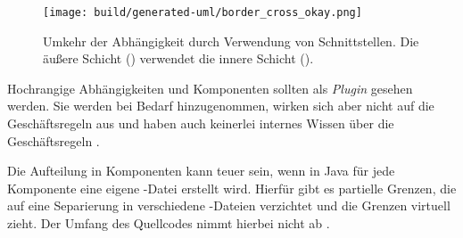 \begin{figure}
  \centering
  \texttt{[image: build/generated-uml/border\_cross\_okay.png]}
   \caption{Umkehr der Abhängigkeit durch Verwendung von Schnittstellen. Die äußere Schicht () verwendet die innere Schicht ().}
   \label{fig:border_cross_okay}
\end{figure}

Hochrangige Abhängigkeiten und Komponenten sollten als \textit{Plugin} gesehen werden. Sie werden bei Bedarf hinzugenommen, wirken sich aber nicht auf die Geschäftsregeln aus und haben auch keinerlei internes Wissen über die Geschäftsregeln \citep[vgl.][181]{martin2018}.


Die Aufteilung in Komponenten kann teuer sein, wenn \zb in Java für jede Komponente eine eigene -Datei erstellt wird. Hierfür gibt es partielle Grenzen, die auf eine Separierung in verschiedene -Dateien verzichtet und die Grenzen virtuell zieht. Der Umfang des Quellcodes nimmt hierbei nicht ab \citep[vgl.][218]{martin2018}. 